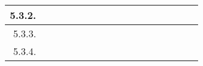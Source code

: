\documentclass[12pt]{article}
\begin{document}
\begin{table}[H]
{\begin{tabular}{|rllllllllllllllll|}
			\multicolumn{1}{|r|}{5.3.2.}                                       & \multicolumn{1}{l|}{}                          & \multicolumn{1}{l|}{}                          & \multicolumn{1}{l|}{}                          & \multicolumn{1}{l|}{}                          & \multicolumn{1}{l|}{}                          & \multicolumn{1}{l|}{}                          & \multicolumn{1}{c|}{\cellcolor[HTML]{A4C2F4}}  & \multicolumn{1}{c|}{\cellcolor[HTML]{A4C2F4}}  & \multicolumn{1}{c|}{\cellcolor[HTML]{B4A7D6}}  & \multicolumn{1}{l|}{}                           & \multicolumn{1}{l|}{}                           & \multicolumn{1}{l|}{}                           & \multicolumn{1}{l|}{}                           & \multicolumn{1}{l|}{}                           & \multicolumn{1}{l|}{}                           &                                                 \\ \hline
			\multicolumn{1}{|r|}{5.3.3.}                                       & \multicolumn{1}{l|}{}                          & \multicolumn{1}{l|}{}                          & \multicolumn{1}{l|}{}                          & \multicolumn{1}{l|}{}                          & \multicolumn{1}{l|}{}                          & \multicolumn{1}{l|}{}                          & \multicolumn{1}{l|}{}                          & \multicolumn{1}{c|}{\cellcolor[HTML]{A4C2F4}}  & \multicolumn{1}{c|}{\cellcolor[HTML]{B4A7D6}}  & \multicolumn{1}{c|}{\cellcolor[HTML]{B4A7D6}}   & \multicolumn{1}{l|}{}                           & \multicolumn{1}{l|}{}                           & \multicolumn{1}{l|}{}                           & \multicolumn{1}{l|}{}                           & \multicolumn{1}{l|}{}                           &                                                 \\ \hline
			\multicolumn{1}{|r|}{5.3.4.}                                       & \multicolumn{1}{l|}{}                          & \multicolumn{1}{l|}{}                          & \multicolumn{1}{l|}{}                          & \multicolumn{1}{l|}{}                          & \multicolumn{1}{l|}{}                          & \multicolumn{1}{l|}{}                          & \multicolumn{1}{l|}{}                          & \multicolumn{1}{l|}{}                          & \multicolumn{1}{l|}{}                          & \multicolumn{1}{c|}{\cellcolor[HTML]{B4A7D6}}   & \multicolumn{1}{l|}{}                           & \multicolumn{1}{l|}{}                           & \multicolumn{1}{l|}{}                           & \multicolumn{1}{l|}{}                           & \multicolumn{1}{l|}{}                           &                                                 \\ \hline

\end{tabular}}
\end{table}
\end{document}
